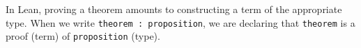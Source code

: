 In Lean, proving a theorem amounts to constructing a term of the appropriate type. 
When we write \lstinline[language=lean]|theorem : proposition|, we are declaring that 
\lstinline[language=lean]|theorem| is a proof (term) of \lstinline[language=lean]|proposition| (type). 




